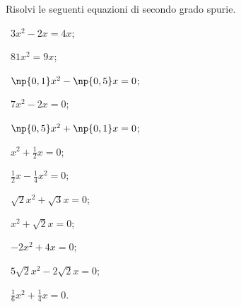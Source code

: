 \begin{esercizio}[\Ast]
 \label{ese:3.6}
Risolvi le seguenti equazioni di secondo grado spurie.
\begin{multicols}{3}
 \begin{enumeratea}
 \item~$3 x^{2} - 2 x = 4 x$;
 \item~$81x^{2} = 9x$;
 \item~$\np{0,1} x^{2} - \np{0,5} x = 0$;
 \item~$7x^{2} - 2x = 0$;
 \item~$\np{0,5} x^{2} + \np{0,1} x = 0$;
 \item~$x^{2} + \frac{1}{2} x = 0$;
 \item~$\frac{1}{2} x - \frac{1}{4} x^{2} = 0$;
 \item~$\sqrt{2} x^{2} + \sqrt{3} x = 0$;
 \item~$x^{2} + \sqrt{2} x = 0$;
 \item~$- 2x^{2} + 4x = 0$;
 \item~$5 \sqrt{2} x^{2} - 2 \sqrt{2} x = 0$;
 \item~$\frac{1}{6} x^{2} + \frac{1}{4} x = 0$.
 \end{enumeratea}
 \end{multicols}
\end{esercizio}


